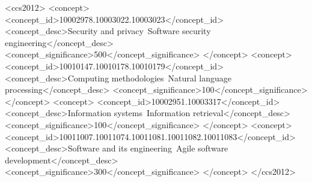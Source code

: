 \documentclass[sigconf,natbib=false,nonacm]{acmart}
\begin{document}
\begin{CCSXML}
<ccs2012>
   <concept>
       <concept_id>10002978.10003022.10003023</concept_id>
       <concept_desc>Security and privacy~Software security engineering</concept_desc>
       <concept_significance>500</concept_significance>
       </concept>
   <concept>
       <concept_id>10010147.10010178.10010179</concept_id>
       <concept_desc>Computing methodologies~Natural language processing</concept_desc>
       <concept_significance>100</concept_significance>
       </concept>
   <concept>
       <concept_id>10002951.10003317</concept_id>
       <concept_desc>Information systems~Information retrieval</concept_desc>
       <concept_significance>100</concept_significance>
       </concept>
   <concept>
       <concept_id>10011007.10011074.10011081.10011082.10011083</concept_id>
       <concept_desc>Software and its engineering~Agile software development</concept_desc>
       <concept_significance>300</concept_significance>
       </concept>
 </ccs2012>
\end{CCSXML}



\maketitle










% 
% 

\printbibliography
\end{document}

